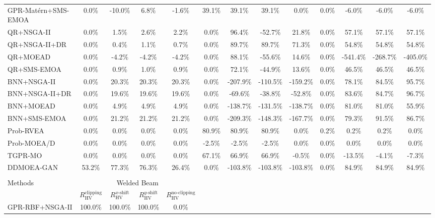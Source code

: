 \begin{table}[htbp]
{\begin{tabular}{l c c c c c c c c c c c c}
GPR-Mat\'ern+SMS-EMOA & 0.0\% & -10.0\% & 6.8\% & -1.6\% & 39.1\% & 39.1\% & 39.1\% & 0.0\% & 0.0\% & -6.0\% & -6.0\% & -6.0\% \\
QR+NSGA-II & 0.0\% & 1.5\% & 2.6\% & 2.2\% & 0.0\% & 96.4\% & -52.7\% & 21.8\% & 0.0\% & 57.1\% & 57.1\% & 57.1\% \\
QR+NSGA-II+DR & 0.0\% & 0.4\% & 1.1\% & 0.7\% & 0.0\% & 89.7\% & 89.7\% & 71.3\% & 0.0\% & 54.8\% & 54.8\% & 54.8\% \\
QR+MOEAD & 0.0\% & -4.2\% & -4.2\% & -4.2\% & 0.0\% & 88.1\% & -55.6\% & 14.6\% & 0.0\% & -541.4\% & -268.7\% & -405.0\% \\
QR+SMS-EMOA & 0.0\% & 0.9\% & 1.0\% & 0.9\% & 0.0\% & 72.1\% & -44.9\% & 13.6\% & 0.0\% & 46.5\% & 46.5\% & 46.5\% \\
BNN+NSGA-II & 0.0\% & 20.3\% & 20.3\% & 20.3\% & 0.0\% & -207.9\% & -110.5\% & -159.2\% & 0.0\% & 78.1\% & 84.5\% & 95.7\% \\
BNN+NSGA-II+DR & 0.0\% & 19.6\% & 19.6\% & 19.6\% & 0.0\% & -69.6\% & -38.8\% & -52.8\% & 0.0\% & 83.6\% & 84.7\% & 96.7\% \\
BNN+MOEAD & 0.0\% & 4.9\% & 4.9\% & 4.9\% & 0.0\% & -138.7\% & -131.5\% & -138.7\% & 0.0\% & 81.0\% & 81.0\% & 55.9\% \\
BNN+SMS-EMOA & 0.0\% & 21.2\% & 21.2\% & 21.2\% & 0.0\% & -209.3\% & -148.3\% & -167.7\% & 0.0\% & 79.3\% & 91.5\% & 86.7\% \\
Prob-RVEA & 0.0\% & 0.0\% & 0.0\% & 0.0\% & 80.9\% & 80.9\% & 80.9\% & 0.0\% & 0.2\% & 0.2\% & 0.2\% & 0.0\% \\
Prob-MOEA/D & 0.0\% & 0.0\% & 0.0\% & 0.0\% & -2.5\% & -2.5\% & -2.5\% & 0.0\% & 0.0\% & 0.0\% & 0.0\% & 0.0\% \\
TGPR-MO & 0.0\% & 0.0\% & 0.0\% & 0.0\% & 67.1\% & 66.9\% & 66.9\% & -0.5\% & 0.0\% & -13.5\% & -4.1\% & -7.3\% \\
DDMOEA-GAN & 53.2\% & 77.3\% & 76.3\% & 26.4\% & 0.0\% & -103.8\% & -103.8\% & -103.8\% & 0.0\% & 84.9\% & 84.9\% & 84.9\% \\
\hline
\multicolumn{13}{c}{} \\
\hline
Methods & \multicolumn{4}{c}{Welded Beam} & \multicolumn{4}{c}{} & \multicolumn{4}{c}{} \\
\cmidrule(lr){2-5}
 & $R_{\mathrm{HV}}^{\mathrm{clipping}}$ & $R_{\mathrm{HV}}^{x\text{-}\mathrm{shift}}$ & $R_{\mathrm{HV}}^{y\text{-}\mathrm{shift}}$ & $R_{\mathrm{HV}}^{\mathrm{no\text{-}clipping}}$ &  &  &  &  &  &  &  &  \\
\hline
GPR-RBF+NSGA-II & 100.0\% & 100.0\% & 100.0\% & 0.0\% &  &  &  &  &  &  &  &  \\

\end{tabular}}
\end{table}
